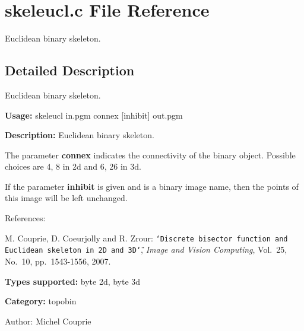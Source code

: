 \section{skeleucl.c File Reference}
\label{skeleucl_8c}
Euclidean binary skeleton.  




\label{_details}
\subsection{Detailed Description}
Euclidean binary skeleton. 

{\bf Usage:} skeleucl in.pgm connex [inhibit] out.pgm

{\bf Description:} Euclidean binary skeleton.

The parameter {\bf connex} indicates the connectivity of the binary object. Possible choices are 4, 8 in 2d and 6, 26 in 3d.

If the parameter {\bf inhibit} is given and is a binary image name, then the points of this image will be left unchanged.

References:\par
 [CCZ07] M. Couprie, D. Coeurjolly and R. Zrour: {\tt \char`\"{}Discrete bisector function and Euclidean skeleton in 2D and 3D\char`\"{}}, {\em Image and Vision Computing\/}, Vol.~25, No.~10, pp.~1543-1556, 2007.\par


{\bf Types supported:} byte 2d, byte 3d

{\bf Category:} topobin

\begin{Desc}
\item[Author:]Michel Couprie \end{Desc}
